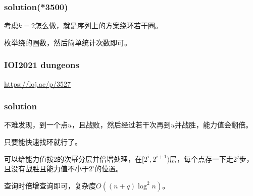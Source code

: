 \documentclass[10pt]{beamer}
\begin{document}
	\clearpage
	\begin{frame}
		\frametitle{solution(*3500)}
	
		考虑$k=2$怎么做，就是序列上的方案绕环若干圈。

		枚举绕的圈数，然后简单统计次数即可。
	
	\end{frame}
	\clearpage
	\begin{frame}
		\frametitle{IOI2021 dungeons}
	
		\url{https://loj.ac/p/3527}
	
	\end{frame}
	\clearpage
	\begin{frame}
		\frametitle{solution}
	
		不难发现，到一个点$u$，且战败，然后经过若干次再到$u$并战胜，能力值会翻倍。

		只要能快速找环就行了。

		可以给能力值按$2$的次幂分层并倍增处理，在$[2^i,2^{i+1})$层，每个点存一下走$2^j$步，且没有战胜且能力值不小于$2^i$的位置。

		查询时倍增查询即可，复杂度$O((n+q)\log^2n)$。
	
	\end{frame}







	
\end{document}
